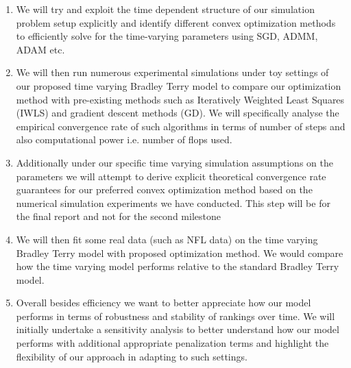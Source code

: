 \documentclass{article}
\begin{document}
\begin{enumerate}
    \item We will try and exploit the time dependent structure of our simulation problem setup explicitly and identify different convex optimization methods to efficiently solve for the time-varying parameters using SGD, ADMM, ADAM etc. 
    
    \item We will then run numerous experimental simulations under toy settings of our proposed time varying Bradley Terry model to compare our optimization method with pre-existing methods such as Iteratively Weighted Least Squares (IWLS) and gradient descent methods (GD). We will specifically analyse the empirical convergence rate of such algorithms in terms of number of steps and also computational power i.e. number of flops used.
    
    \item Additionally under our specific time varying simulation assumptions on the parameters we will attempt to derive explicit theoretical convergence rate guarantees for our preferred convex optimization method based on the numerical simulation experiments we have conducted. This step will be for the final report and not for the second milestone
    
    \item We will then fit some real data (such as NFL data) on the time varying Bradley Terry model with proposed optimization method. We would compare how the time varying model performs relative to the standard Bradley Terry model.
    
    \item Overall besides efficiency we want to better appreciate how our model performs in terms of robustness and stability of rankings over time. We will initially undertake a sensitivity analysis to better understand how our model performs with additional appropriate penalization terms and highlight the flexibility of our approach in adapting to such settings.
\end{enumerate}





\end{document}
